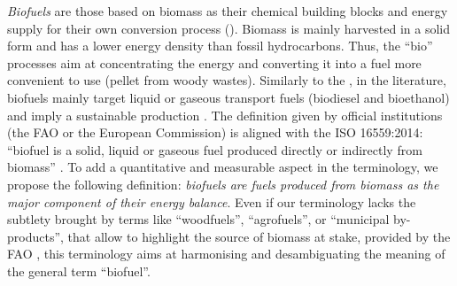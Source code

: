 
\textit{Biofuels} are those based on biomass as their chemical building blocks and energy supply for their own conversion process (). Biomass is mainly harvested in a solid form and has a lower energy density than fossil hydrocarbons. Thus, the ``bio'' processes aim at concentrating the energy and converting it into a fuel more convenient to use (\eg pellet from woody wastes). %
Similarly to the \citet{OEERE_biofuel}, in the literature, biofuels mainly target liquid or gaseous transport fuels (\eg biodiesel and bioethanol) and imply a sustainable production \cite{eu_biofuel, pottering2009directive}. The definition given by official institutions (\eg the FAO or the European Commission) is aligned with the ISO 16559:2014: ``biofuel is a solid, liquid or gaseous fuel produced directly or indirectly from biomass'' \cite{eu_biofuels, FAO_biofuel, ISO16559}. To add a quantitative and measurable aspect in the terminology, we propose the following definition: \textit{biofuels are fuels produced from biomass as the major component of their energy balance}. Even if our terminology lacks the subtlety brought by terms like ``woodfuels'', ``agrofuels'', or ``municipal by-products'', that allow to highlight the source of biomass at stake, provided by the FAO \cite{FAO_biofuel}, this terminology aims at harmonising and desambiguating the meaning of the general term ``biofuel''.


 
